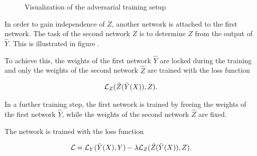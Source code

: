 \documentclass[12pt, a4paper]{thesis}
\begin{document}
\begin{figure}[H]
\caption{Visualization of the adversarial training setup}
\label{adv-training}
\end{figure}

In order to gain independence of \(Z\), another network is attached to
the first network. The task of the second network \( Z\) is to
determine \(Z\) from the output of \(\hat Y\). This is illustrated in
figure \label{adv-training}.

To achieve this, the weights of the first network \(\hat Y\) are
locked during the training and only the weights of the second network
\(\hat Z\) are trained with the loss function

\begin{align}
  {\cal L}_Z(\hat Z(\hat Y(X)), Z).
\end{align}

In a further training step, the first network is trained by freeing
the weights of the first network \(\hat Y\), while the weights of the
second network \(\hat Z\) are fixed.

The network is trained with the loss function

\begin{align}
{\cal L} = {\cal L}_Y(\hat Y(X), Y) - \lambda {\cal L}_Z(\hat Z(\hat Y(X)), Z).
\end{align}
\end{document}

